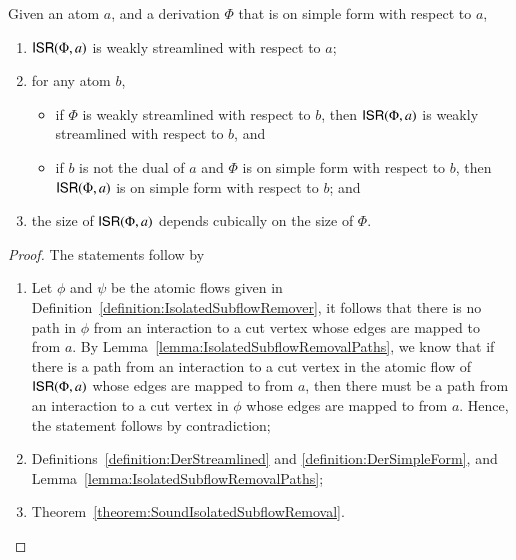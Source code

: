 

\begin{proposition}\label{proposition:IsolatedSubflowRemover}
Given an atom $a$, and a derivation $\Phi$ that is on simple form with respect to $a$,
\begin{enumerate}
\item $\mathsf{ISR}(\Phi,a)$ is weakly streamlined with respect to $a$;
\item for any atom $b$,
\begin{itemize}
\item if $\Phi$ is weakly streamlined with respect to $b$, then $\mathsf{ISR}(\Phi,a)$ is weakly streamlined with respect to $b$, and
\item if $b$ is not the dual of $a$ and $\Phi$ is on simple form with respect to $b$, then $\mathsf{ISR}(\Phi,a)$ is on simple form with respect to $b$; and
\end{itemize}
\item the size of\/ $\mathsf{ISR}(\Phi,a)$ depends cubically on the size of\/ $\Phi$.
\end{enumerate}
\end{proposition}


\begin{proof}
The statements follow by
\begin{enumerate}
\item Let $\phi$ and $\psi$ be the atomic flows given in Definition~\ref{definition:IsolatedSubflowRemover}, it follows that there is no path in $\phi$ from an interaction to a cut vertex whose edges are mapped to from $a$. By Lemma~\vref{lemma:IsolatedSubflowRemovalPaths}, we know that if there is a path from an interaction to a cut vertex in the atomic flow of $\mathsf{ISR}(\Phi,a)$ whose edges are mapped to from $a$, then there must be a path from an interaction to a cut vertex in $\phi$ whose edges are mapped to from $a$. Hence, the statement follows by contradiction;
\item Definitions~\ref{definition:DerStreamlined} and \ref{definition:DerSimpleForm}, and Lemma~\ref{lemma:IsolatedSubflowRemovalPaths};
\item Theorem~\vref{theorem:SoundIsolatedSubflowRemoval}.
\end{enumerate}
\end{proof}

